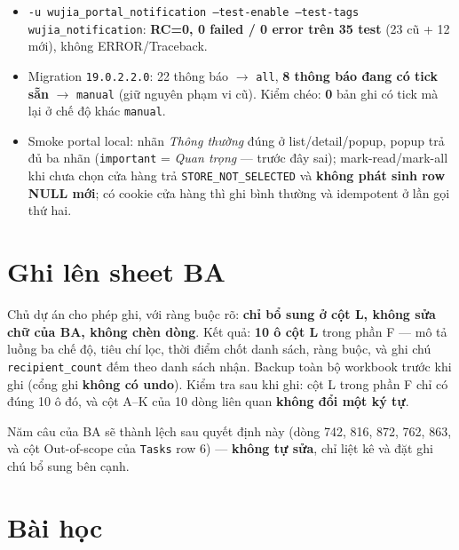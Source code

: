 \begin{itemize}
  \item \texttt{-u wujia\_portal\_notification --test-enable --test-tags wujia\_notification}:
    \textbf{RC=0, 0 failed / 0 error trên 35 test} (23 cũ + 12 mới), không ERROR/Traceback.
  \item Migration \texttt{19.0.2.2.0}: 22 thông báo $\to$ \texttt{all}, \textbf{8 thông báo đang có
    tick sẵn} $\to$ \texttt{manual} (giữ nguyên phạm vi cũ). Kiểm chéo: \textbf{0} bản ghi có tick mà
    lại ở chế độ khác \texttt{manual}.
  \item Smoke portal local: nhãn \emph{Thông thường} đúng ở list/detail/popup, popup trả đủ ba nhãn
    (\texttt{important} = \emph{Quan trọng} --- trước đây sai); mark-read/mark-all khi chưa chọn cửa
    hàng trả \texttt{STORE\_NOT\_SELECTED} và \textbf{không phát sinh row NULL mới}; có cookie cửa
    hàng thì ghi bình thường và idempotent ở lần gọi thứ hai.
\end{itemize}

\section{Ghi lên sheet BA}

Chủ dự án cho phép ghi, với ràng buộc rõ: \textbf{chỉ bổ sung ở cột L, không sửa chữ của BA, không
chèn dòng}. Kết quả: \textbf{10 ô cột L} trong phần F --- mô tả luồng ba chế độ, tiêu chí lọc, thời
điểm chốt danh sách, ràng buộc, và ghi chú \texttt{recipient\_count} đếm theo danh sách nhận. Backup
toàn bộ workbook trước khi ghi (cổng ghi \textbf{không có undo}). Kiểm tra sau khi ghi: cột L trong
phần F chỉ có đúng 10 ô đó, và cột A--K của 10 dòng liên quan \textbf{không đổi một ký tự}.

Năm câu của BA sẽ thành lệch sau quyết định này (dòng 742, 816, 872, 762, 863, và cột Out-of-scope
của \texttt{Tasks} row 6) --- \textbf{không tự sửa}, chỉ liệt kê và đặt ghi chú bổ sung bên cạnh.

\section{Bài học}

